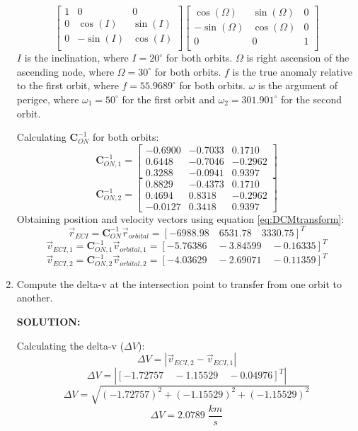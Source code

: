 \documentclass[12pt, letterpaper]{aiaa-tc}
\begin{document}
\begin{enumerate}
\[\begin{bmatrix}
        1 & 0 & 0 \\
        0 & \cos(I) & \sin(I) \\
        0 & -\sin(I) & \cos(I) \\
    \end{bmatrix}
    \begin{bmatrix}
        \cos(\Omega) & \sin(\Omega) & 0 \\
        -\sin(\Omega) & \cos(\Omega) & 0 \\
        0 & 0 & 1 \\
    \end{bmatrix} \]
    $I$ is the inclination, where $I=20^{\circ}$ for both orbits.
    $\Omega$ is right ascension of the ascending node, where $\Omega=30^{\circ}$ for both orbits.
    $f$ is the true anomaly relative to the first orbit, where $f=55.9689^{\circ}$ for both orbits.
    $\omega$ is the argument of perigee, where $\omega_1=50^{\circ}$ for the first orbit and 
    $\omega_2=301.901^{\circ}$ for the second orbit.

    Calculating $\bm{C}^{-1}_{ON}$ for both orbits:
    \[ \bm{C}^{-1}_{ON,1}=
    \begin{bmatrix}
        -0.6900 & -0.7033 & 0.1710\\ 0.6448 & -0.7046 & -0.2962\\ 0.3288 & -0.0941 & 0.9397
    \end{bmatrix}\]
    \[ \bm{C}^{-1}_{ON,2}=
    \begin{bmatrix}
        0.8829 & -0.4373 & 0.1710\\ 0.4694 & 0.8318 & -0.2962\\ -0.0127 & 0.3418 & 0.9397
    \end{bmatrix}\]
    Obtaining position and velocity vectors using equation \eqref{eq:DCMtransform}:
    \[ \vec{r}_{ECI}=\bm{C}^{-1}_{ON}\vec{r}_{orbital}=[-6988.98\quad 6531.78\quad 3330.75]^T \]
    \[ \vec{v}_{ECI,1}=\bm{C}^{-1}_{ON,1}\vec{v}_{orbital,1}=[ -5.76386\quad -3.84599\quad -0.16335]^T \]
    \[ \vec{v}_{ECI,2}=\bm{C}^{-1}_{ON,2}\vec{v}_{orbital,2}=[-4.03629\quad -2.69071\quad -0.11359]^T \]
    \item Compute the delta-v at the intersection point to transfer from one orbit to another.
    
    \textbf{SOLUTION:}
    
    Calculating the delta-v ($\Delta V$):
    \[ \Delta V=|\vec{v}_{ECI,2}-\vec{v}_{ECI,1}| \]
    \[ \Delta V=|[-1.72757\quad -1.15529\quad -0.04976]^T| \]
    \[ \Delta V=\sqrt{(-1.72757)^2+(-1.15529)^2+(-1.15529)^2} \]
    \[ \Delta V=2.0789\;\frac{km}{s} \]

\end{enumerate}
\end{document}
